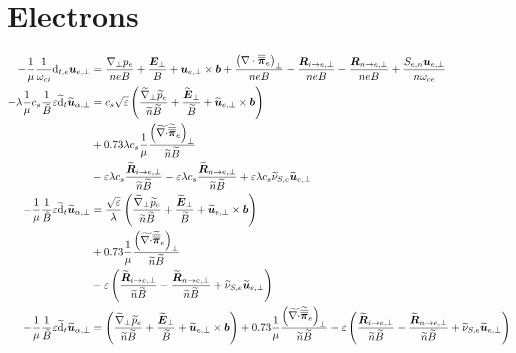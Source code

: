 \section{Electrons}
%
\begin{align*}
    -\frac{1}{\mu} \frac{1}{\om_{ci}}\d_{t,e} \ve{u}_{e,\perp}
 &=
  \frac{ \grad_\perp p_e }{neB}
 + \frac{\ve{E}_\perp}{B}
 + \ve{u}_{e,\perp}\times\ve{b}
 + \frac{ \L(\div\te{\pi}_e\R)_\perp }{ne B}
 - \frac{ \ve{R}_{i \to e,\perp} }{neB}
 - \frac{ \ve{R}_{n \to e,\perp} }{n e B}
 + \frac{ S_{e,n}\ve{u}_{e,\perp} }{n \om_{ce}}
 \\
 -\lambda \frac{1}{\mu} c_s \frac{1}{\tilde{B}} \e \wt{\d}_{t}\wt{\ve{u}}_{\a,\perp}
 &=
c_s
\sqrt{\e}
\L(
\frac{ \wt{\grad}_\perp \wt{p}_e }{\wt{n} \wt{B}}
+
\frac{\wt{\ve{E}}_\perp}{\wt{B}}
+
\wt{\ve{u}}_{e,\perp}\times\ve{b}
\R)
\\ &
 + 0.73 \lambda c_s \frac{1}{\mu} \frac{\L(\wt{\div}\wt{\te{\pi}}_e\R)_\perp}{\wt{n}\wt{B}}
\\ &
 - \e \lambda c_s \frac{\wt{\ve{R}}_{i \to e,\perp} }{\wt{n}\wt{B}}
 - \e \lambda c_s \frac{\wt{\ve{R}}_{n \to e,\perp} }{\wt{n} \wt{B}}
 +  \e \lambda c_s \wt{\nu}_{S,e}\wt{\ve{u}}_{e,\perp}
 \\
 -\frac{1}{\mu} \frac{1}{\tilde{B}} \e \wt{\d}_{t}\wt{\ve{u}}_{\a,\perp}
 &=
 \frac{\sqrt{\e}}{\lambda}
\L(
\frac{ \wt{\grad}_\perp \wt{p}_e }{\wt{n} \wt{B}}
+
\frac{\wt{\ve{E}}_\perp}{\wt{B}}
+
\wt{\ve{u}}_{e,\perp}\times\ve{b}
\R)
\\ &
 + 0.73 \frac{1}{\mu} \frac{\L(\wt{\div}\wt{\te{\pi}}_e\R)_\perp}{\wt{n}\wt{B}}
\\ &
- \e \L( \frac{\wt{\ve{R}}_{i \to e,\perp} }{\wt{n}\wt{B}}
 -  \frac{\wt{\ve{R}}_{n \to e,\perp} }{\wt{n} \wt{B}}
 +    \wt{\nu}_{S,e}\wt{\ve{u}}_{e,\perp}\R)
 \\
 -\frac{1}{\mu} \frac{1}{\tilde{B}} \e \wt{\d}_{t}\wt{\ve{u}}_{\a,\perp}
 &=
\L(
\frac{ \wt{\grad}_\perp \wt{p}_e }{\wt{n} \wt{B}}
+
\frac{\wt{\ve{E}}_\perp}{\wt{B}}
+
\wt{\ve{u}}_{e,\perp}\times\ve{b}
\R)
 + 0.73 \frac{1}{\mu} \frac{\L(\wt{\div}\wt{\te{\pi}}_e\R)_\perp}{\wt{n}\wt{B}}
- \e \L( \frac{\wt{\ve{R}}_{i \to e,\perp} }{\wt{n}\wt{B}}
 -  \frac{\wt{\ve{R}}_{n \to e,\perp} }{\wt{n} \wt{B}}
 +    \wt{\nu}_{S,e}\wt{\ve{u}}_{e,\perp}\R)
\end{align*}



